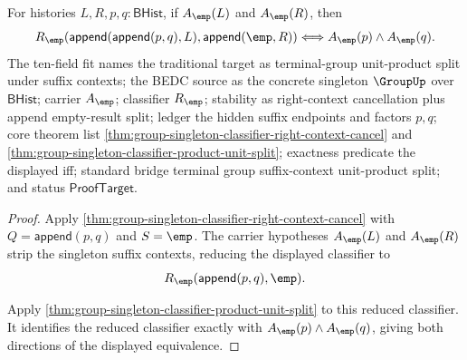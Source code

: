 \begin{theorem}
\label{thm:group-singleton-suffix-contextual-product-unit-split}
For histories $L,R,p,q:\mathsf{BHist}$, if $A_{\emp}(L)$ and $A_{\emp}(R)$,
then
$$
R_{\emp}(\mathsf{append}(\mathsf{append}(p,q),L),\mathsf{append}(\emp,R))
\Longleftrightarrow
A_{\emp}(p)\land A_{\emp}(q).
$$
The ten-field fit names the traditional target as terminal-group unit-product
split under suffix contexts; the BEDC source as the concrete singleton
$\GroupUp$ over $\mathsf{BHist}$; carrier $A_{\emp}$; classifier $R_{\emp}$;
stability as right-context cancellation plus append empty-result split; ledger
the hidden suffix endpoints and factors $p,q$; core theorem list
\autoref{thm:group-singleton-classifier-right-context-cancel} and
\autoref{thm:group-singleton-classifier-product-unit-split}; exactness
predicate the displayed iff; standard bridge terminal group suffix-context
unit-product split; and status $\mathsf{ProofTarget}$.
\end{theorem}
\begin{proof}
Apply \autoref{thm:group-singleton-classifier-right-context-cancel} with
$Q=\mathsf{append}(p,q)$ and $S=\emp$. The carrier hypotheses $A_{\emp}(L)$ and
$A_{\emp}(R)$ strip the singleton suffix contexts, reducing the displayed
classifier to
$$
R_{\emp}(\mathsf{append}(p,q),\emp).
$$

Apply \autoref{thm:group-singleton-classifier-product-unit-split} to this
reduced classifier. It identifies the reduced classifier exactly with
$A_{\emp}(p)\land A_{\emp}(q)$, giving both directions of the displayed
equivalence.
\end{proof}

